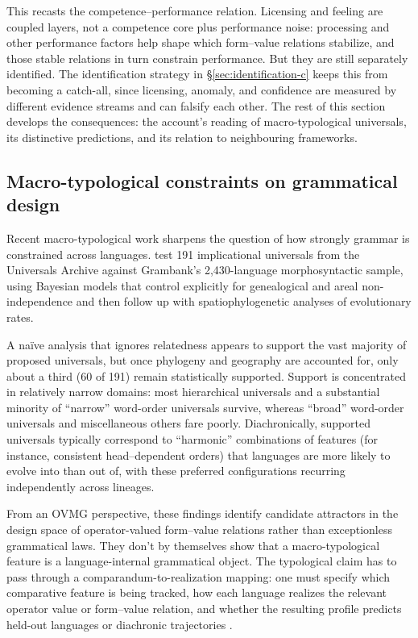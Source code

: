 \documentclass[12pt,letterpaper]{article}
\begin{document}
This recasts the competence--performance relation. Licensing and feeling are coupled layers, not a competence core plus performance noise: processing and other performance factors help shape which form--value relations stabilize, and those stable relations in turn constrain performance. But they are still separately identified. The identification strategy in \S\ref{sec:identification-c} keeps this from becoming a catch-all, since licensing, anomaly, and confidence are measured by different evidence streams and can falsify each other. The rest of this section develops the consequences: the account's reading of macro-typological universals, its distinctive predictions, and its relation to neighbouring frameworks.

\subsection{Macro-typological constraints on grammatical design}

Recent macro-typological work sharpens the question of how strongly grammar is
constrained across languages. \textcite{verkerk2025} test 191 implicational
universals from the Universals Archive against Grambank's 2{,}430-language
morphosyntactic sample, using Bayesian models that control explicitly for
genealogical and areal non-independence and then follow up with
spatiophylogenetic analyses of evolutionary rates.

A naïve analysis that ignores relatedness appears to support the vast majority
of proposed universals, but once phylogeny and geography are accounted for, only
about a third (60 of 191) remain statistically supported. Support is concentrated
in relatively narrow domains: most hierarchical universals and a substantial
minority of \enquote{narrow} word-order universals survive, whereas
\enquote{broad} word-order universals and miscellaneous others fare poorly.
Diachronically, supported universals typically correspond to \enquote{harmonic}
combinations of features (for instance, consistent head--dependent orders) that
languages are more likely to evolve into than out of, with these preferred
configurations recurring independently across lineages.

From an OVMG perspective, these findings identify candidate attractors in the
design space of operator-valued form--value relations rather than exceptionless
grammatical laws. They don't by themselves show that a macro-typological feature
is a language-internal grammatical object. The typological claim has to pass
through a comparandum-to-realization mapping: one must specify which comparative
feature is being tracked, how each language realizes the relevant operator value
or form--value relation, and whether the resulting profile predicts held-out
languages or diachronic trajectories \autocite{reynolds2025comparanda}.
\end{document}
